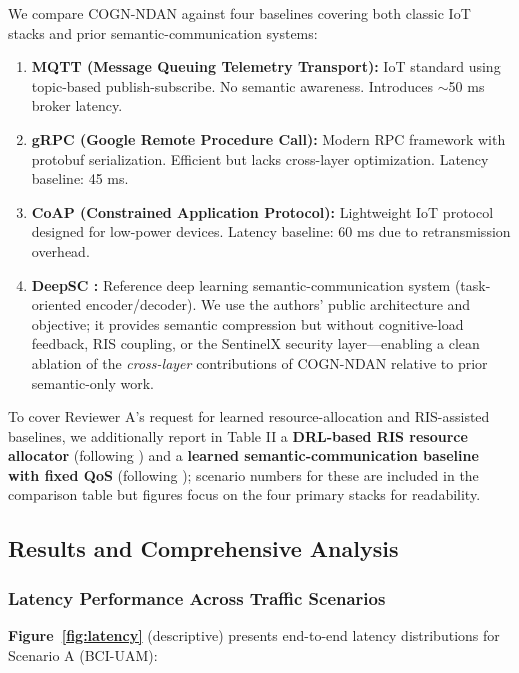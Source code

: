 \documentclass[journal]{IEEEtran}
\newcommand{\COGN}{COGN-NDAN}
\begin{document}
We compare \COGN{} against four baselines covering both classic IoT stacks and prior semantic-communication systems:
\begin{enumerate}
    \item \textbf{MQTT (Message Queuing Telemetry Transport):} IoT standard using topic-based publish-subscribe. No semantic awareness. Introduces $\sim$50 ms broker latency.
    \item \textbf{gRPC (Google Remote Procedure Call):} Modern RPC framework with protobuf serialization. Efficient but lacks cross-layer optimization. Latency baseline: 45 ms.
    \item \textbf{CoAP (Constrained Application Protocol):} Lightweight IoT protocol designed for low-power devices. Latency baseline: 60 ms due to retransmission overhead.
    \item \textbf{DeepSC \cite{xie2022semantic}:} Reference deep learning semantic-communication system (task-oriented encoder/decoder). We use the authors' public architecture and objective; it provides semantic compression but without cognitive-load feedback, RIS coupling, or the SentinelX security layer---enabling a clean ablation of the \emph{cross-layer} contributions of \COGN{} relative to prior semantic-only work.
\end{enumerate}

To cover Reviewer A's request for learned resource-allocation and RIS-assisted baselines, we additionally report in Table II a \textbf{DRL-based RIS resource allocator} (following \cite{alwarafy2022}) and a \textbf{learned semantic-communication baseline with fixed QoS} (following \cite{chen2024ris}); scenario numbers for these are included in the comparison table but figures focus on the four primary stacks for readability.

\subsection{Results and Comprehensive Analysis}

\subsubsection{Latency Performance Across Traffic Scenarios}
\textbf{Figure~\ref{fig:latency}} (descriptive) presents end-to-end latency distributions for Scenario A (BCI-UAM):
\end{document}
